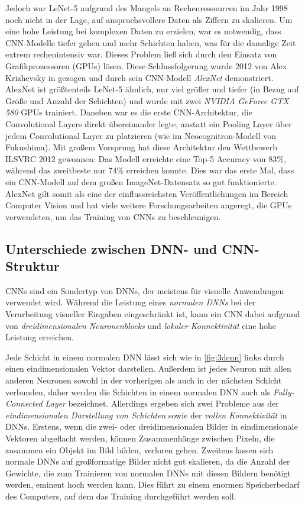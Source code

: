 \begin{description}
	Jedoch war LeNet-5 aufgrund des Mangels an Rechenressourcen im Jahr 1998 noch nicht in der Lage, auf anspruchsvollere Daten als Ziffern zu skalieren. Um eine hohe Leistung bei komplexen Daten zu erzielen, war es notwendig, dass CNN-Modelle tiefer gehen und mehr Schichten haben, was für die damalige Zeit extrem rechenintensiv war. Dieses Problem ließ sich durch den Einsatz von Grafikprozessoren (GPUs) lösen. Diese Schlussfolgerung wurde 2012 von Alex Krizhevsky in \cite{10.1145/3065386} gezogen und durch sein CNN-Modell \emph{AlexNet} demonstriert. AlexNet ist größtenteils LeNet-5 ähnlich, nur viel größer und tiefer (in Bezug auf Größe und Anzahl der Schichten) und wurde mit zwei \emph{NVIDIA GeForce GTX 580} GPUs trainiert. Daneben war es die erste CNN-Architektur, die Convolutional Layers direkt übereinander legte, anstatt ein Pooling Layer über jedem Convolutional Layer zu platzieren (wie im Neocognitron-Modell von Fukushima). Mit großem Vorsprung hat diese Architektur den Wettbewerb ILSVRC 2012 gewonnen: Das Modell erreichte eine Top-5 Accuracy von 83\%, während das zweitbeste nur 74\% erreichen konnte. Dies war das erste Mal, dass ein CNN-Modell auf dem großen ImageNet-Datensatz so gut funktionierte. AlexNet gilt somit als eine der einflussreichsten Veröffentlichungen im Bereich Computer Vision und hat viele weitere Forschungsarbeiten angeregt, die GPUs verwendeten, um das Training von CNNs zu beschleunigen.
	
\end{description}

\subsection{Unterschiede zwischen DNN- und CNN-Struktur}

CNNs sind ein Sondertyp von DNNs, der meistens für visuelle Anwendungen verwendet wird. Während die Leistung eines \emph{normalen DNNs} bei der Verarbeitung visueller Eingaben eingeschränkt ist, kann ein CNN dabei aufgrund von \emph{dreidimensionalen Neuronenblocks} und \emph{lokaler Konnektivität} eine hohe Leistung erreichen. 

Jede Schicht in einem normalen DNN lässt sich wie in \autoref{fig:3dcnn} links durch einen eindimensionalen Vektor darstellen. Außerdem ist jedes Neuron mit allen anderen Neuronen sowohl in der vorherigen als auch in der nächsten Schicht verbunden, daher werden die Schichten in einem normalen DNN auch als \emph{Fully-Connected Layer} bezeichnet. Allerdings ergeben sich zwei Probleme aus der \emph{eindimensionalen Darstellung von Schichten} sowie der \emph{vollen Konnektivität} in DNNs. Erstens, wenn die zwei- oder dreidimensionalen Bilder in eindimensionale Vektoren abgeflacht werden, können Zusammenhänge zwischen Pixeln, die zusammen ein Objekt im Bild bilden, verloren gehen. Zweitens lassen sich normale DNNs auf großformatige Bilder nicht gut skalieren, da die Anzahl der Gewichte, die zum Trainieren von normalen DNNs mit diesen Bildern benötigt werden, eminent hoch werden kann. Dies führt zu einem enormen Speicherbedarf des Computers, auf dem das Training durchgeführt werden soll.

